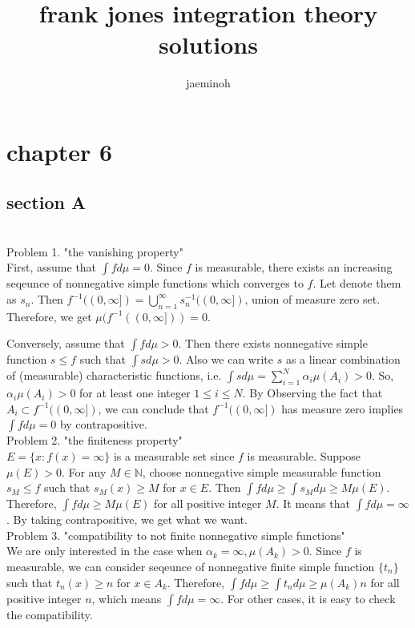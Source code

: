 \documentclass{amsart}
\author{jaeminoh}
\title{frank jones integration theory solutions}
\begin{document}
\maketitle

\section*{chapter 6}
\subsection*{section A}\hfill \\

Problem 1. "the vanishing property"\\

First, assume that $\int f d\mu = 0$. Since $f$ is measurable, there exists
an increasing seqeunce of nonnegative simple functions which converges to $f$. Let
denote them as $s_n$. Then $f^{-1}((0, \infty]) = \bigcup_{n=1}^{\infty}s_n ^{-1}((0, \infty])$, union of measure zero set.
Therefore, we get $\mu(f^{-1}((0, \infty])) = 0$.

Conversely, assume that $\int f d\mu > 0$. Then there exists nonnegative
simple function $s \leq f$ such that $\int s d\mu > 0$. Also we can write $s$ as
a linear combination of (measurable) characteristic functions, i.e. $\int s d \mu = \sum_{i=1}^N \alpha_i \mu(A_i) >0$.
So, $\alpha_i \mu(A_i) > 0$ for at least one integer $1 \leq i \leq N$. By Observing the fact that $A_i \subset f^{-1}((0, \infty])$,
we can conclude that $f^{-1}((0, \infty])$ has measure zero implies $\int f d \mu = 0$ by contrapositive.\\

Problem 2. "the finiteness property"\\

$E = \{x: f(x) = \infty \}$ is a measurable set since $f$ is measurable.
Suppose $\mu(E) > 0$. For any $M \in \mathbb{N}$, choose nonnegative simple measurable function $s_M \leq f$ such that $s_M(x) \geq M$ for $x \in E$.
Then $\int f d\mu \geq \int s_M d\mu \geq M \mu(E)$. Therefore, $\int f d\mu \geq M \mu(E)$ for all positive integer $M$.
It means that $\int f d\mu = \infty$. By taking contrapositive, we get what we want.\\

Problem 3. "compatibility to not finite nonnegative simple functions" \\

We are only interested in the case when $\alpha_k = \infty, \mu(A_k) > 0$.
Since $f$ is measurable, we can consider seqeunce of nonnegative finite simple function
$\{ t_n\}$ such that $t_n(x) \geq n$ for $x \in A_k$.
Therefore, $\int f d\mu \geq \int t_n d\mu \geq \mu(A_k)n$ for all positive integer $n$, which means $\int f d\mu = \infty$.
For other cases, it is easy to check the compatibility.\\
\end{document}
